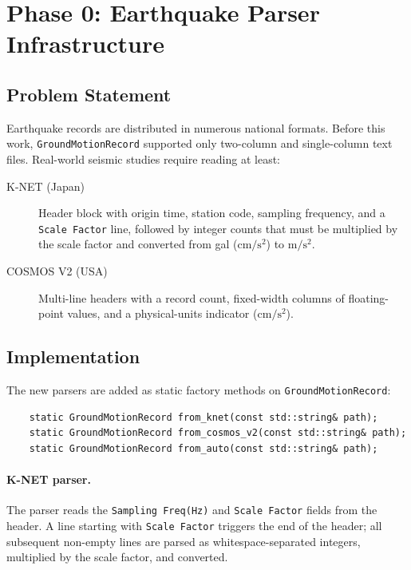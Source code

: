 \section{Phase 0: Earthquake Parser Infrastructure}
\label{sec:phase0_parsers}

\subsection{Problem Statement}

Earthquake records are distributed in numerous national formats.  Before this
work, \texttt{GroundMotionRecord} supported only two-column and single-column
text files.  Real-world seismic studies require reading at least:

\begin{description}
  \item[K-NET (Japan)] Header block with origin time, station code, sampling
    frequency, and a \texttt{Scale Factor} line, followed by integer counts
    that must be multiplied by the scale factor and converted from gal
    ($\mathrm{cm/s^2}$) to $\mathrm{m/s^2}$.
  \item[COSMOS V2 (USA)] Multi-line headers with a record count, fixed-width
    columns of floating-point values, and a physical-units indicator
    ($\mathrm{cm/s^2}$).
\end{description}

\subsection{Implementation}

The new parsers are added as static factory methods on
\texttt{GroundMotionRecord}:

\begin{verbatim}
    static GroundMotionRecord from_knet(const std::string& path);
    static GroundMotionRecord from_cosmos_v2(const std::string& path);
    static GroundMotionRecord from_auto(const std::string& path);
\end{verbatim}

\paragraph{K-NET parser.}
The parser reads the \texttt{Sampling Freq(Hz)} and
\texttt{Scale Factor} fields from the header.  A line starting with
\texttt{Scale Factor} triggers the end of the header; all subsequent non-empty
lines are parsed as whitespace-separated integers, multiplied by the scale
factor, and converted.

